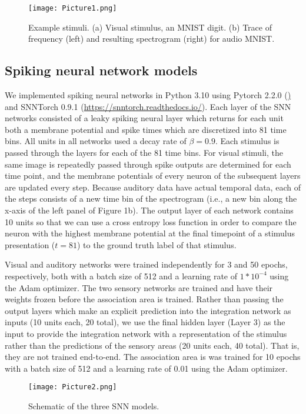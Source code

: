\documentclass[conference]{IEEEtran}
\begin{document}
\begin{figure}[htbp]
\centerline{\texttt{[image: Picture1.png]}}
\caption{Example stimuli. (a) Visual stimulus, an MNIST digit. (b) Trace of frequency (left) and resulting spectrogram (right) for audio MNIST.}
\label{fig1}
\end{figure}

\subsection{Spiking neural network models}
We implemented spiking neural networks in Python 3.10 using Pytorch 2.2.0 (\href{https://pytorch.org/}) and SNNTorch 0.9.1 (\url{https://snntorch.readthedocs.io/}). Each layer of the SNN networks consisted of a leaky spiking neural layer which returns for each unit both a membrane potential and spike times which are discretized into 81 time bins. All units in all networks used a decay rate of $\beta=0.9$. Each stimulus is passed through the layers for each of the 81 time bins. For visual stimuli, the same image is repeatedly passed through
spike outputs are determined for each time point, and the membrane potentials of every neuron of the subsequent layers are updated every step. Because auditory data have actual temporal data, each of the steps consists of a new time bin of the spectrogram (i.e., a new bin along the x-axis of the left panel of Figure 1b). The output layer of each network contains 10 units so that we can use a cross entropy loss function in order to compare the neuron with the highest membrane potential at the final timepoint of a stimulus presentation ($t=81$) to the ground truth label of that stimulus.

Visual and auditory networks were trained independently for 3 and 50 epochs, respectively, both with a batch size of 512 and a learning rate of $1*10^{-4}$ using the Adam optimizer. The two sensory networks are trained and have their weights frozen before the association area is trained. Rather than passing the output layers which make an explicit prediction into the integration network as inputs (10 units each, 20 total), we use the final hidden layer (Layer 3) as the input to provide the integration network with a representation of the stimulus rather than the predictions of the sensory areas (20 units each, 40 total). That is, they are not trained end-to-end. The association area is was trained for 10 epochs with a batch size of 512 and a learning rate of 0.01 using the Adam optimizer.

\begin{figure}[htbp]
\centerline{\texttt{[image: Picture2.png]}}
\caption{Schematic of the three SNN models.}
\label{fig2}
\end{figure}
\end{document}
